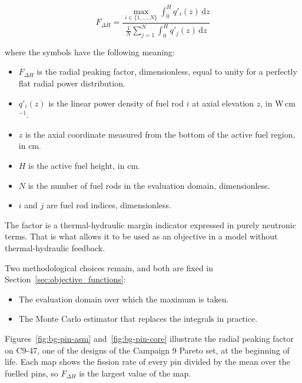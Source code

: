 \begin{equation}
F_{\Delta H}
=
\frac{\displaystyle \max_{i \in \{1,\dots,N\}} \int_{0}^{H} q'_i(z)\,\mathrm{d}z}
     {\displaystyle \frac{1}{N} \sum_{j=1}^{N} \int_{0}^{H} q'_j(z)\,\mathrm{d}z}
\label{eq:fdh_definition}
\end{equation}

\noindent where the symbols have the following meaning:

\begin{itemize}
  \item $F_{\Delta H}$ is the radial peaking factor, dimensionless,
        equal to unity for a perfectly flat radial power distribution.

  \item $q'_i(z)$ is the linear power density of fuel rod $i$ at axial
        elevation $z$, in W\,cm$^{-1}$.

  \item $z$ is the axial coordinate measured from the bottom of the
        active fuel region, in cm.

  \item $H$ is the active fuel height, in cm.

  \item $N$ is the number of fuel rods in the evaluation domain,
        dimensionless.

  \item $i$ and $j$ are fuel rod indices, dimensionless.
\end{itemize}

The factor is a thermal-hydraulic margin indicator expressed in purely
neutronic terms. That is what allows it to be used as an objective in a
model without thermal-hydraulic feedback.

Two methodological choices remain, and both are fixed in
Section~\ref{sec:objective_functions}:

\begin{itemize}
  \item The evaluation domain over which the maximum is taken.

  \item The Monte Carlo estimator that replaces the integrals in
        practice.
\end{itemize}

Figures~\ref{fig:bg-pin-asm} and~\ref{fig:bg-pin-core} illustrate the
radial peaking factor on C9-47, one of the designs of the Campaign 9
Pareto set, at the beginning of life. Each map shows the fission rate of every pin divided by the mean
over the fuelled pins, so $F_{\Delta H}$ is the largest value of the
map.

